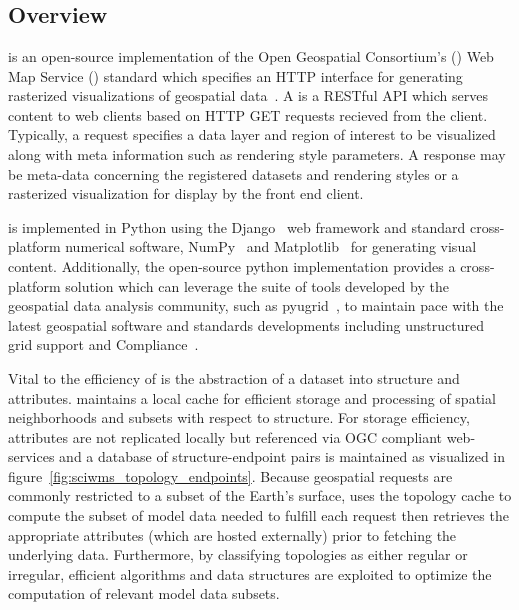 \section{\sciwms{}}
\label{sec:sciwms}

\subsection{Overview}
\Sciwms{} is an open-source implementation of the Open Geospatial
Consortium's (\ogc{}) Web Map Service (\wms{}) standard which
specifies an HTTP interface for generating rasterized visualizations
of geospatial data~\cite{wms14}. A \wms{} is a RESTful API which
serves content to web clients based on HTTP GET requests recieved from
the client. Typically, a \wms{} request specifies a data layer and
region of interest to be visualized along with meta information such
as rendering style parameters. A \wms{} response may be meta-data
concerning the registered datasets and rendering styles or a
rasterized visualization for display by the front end client.

\sciwms{} is implemented in Python using the Django~\cite{django} web
framework and standard cross-platform numerical software,
NumPy~\cite{numpy11} and Matplotlib~\cite{hunter07} for generating
visual content. Additionally, the open-source python implementation
provides a cross-platform \wms{} solution which can leverage the suite
of tools developed by the geospatial data analysis community, such as
pyugrid~\cite{pyugrid}, to maintain pace with the latest geospatial
software and standards developments including unstructured grid
support and \cfugrid{} Compliance~\cite{cfugrid}.

Vital to the efficiency of \sciwms{} is the abstraction of a dataset
into structure and attributes. \Sciwms{} maintains a local cache for
efficient storage and processing of spatial neighborhoods and subsets
with respect to structure. For storage efficiency, attributes are not
replicated locally but referenced via OGC compliant web-services and a
database of structure-endpoint pairs is maintained as visualized in
figure~\ref{fig:sciwms_topology_endpoints}. Because geospatial \wms{}
requests are commonly restricted to a subset of the Earth's surface,
\sciwms{} uses the topology cache to compute the subset of model data
needed to fulfill each request then retrieves the appropriate
attributes (which are hosted externally) prior to fetching the
underlying data. Furthermore, by classifying topologies as either
regular or irregular, efficient algorithms and data structures are
exploited to optimize the computation of relevant model data subsets.

